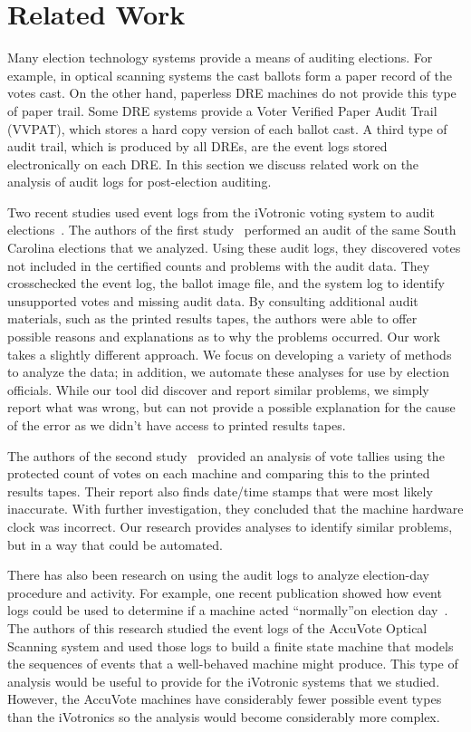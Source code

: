 \section{Related Work}
Many election technology systems provide a means of auditing elections. For example, in optical scanning systems the cast ballots form a paper record of the votes cast.  On the other hand, paperless DRE machines do not provide this type of paper trail. Some DRE systems provide a Voter Verified Paper Audit Trail (VVPAT), which stores a hard copy version of each ballot cast.  A third type of audit trail, which is produced by all DREs, are the event logs stored electronically on each DRE.  In this section we discuss related work on the analysis of audit logs for post-election auditing. 

Two recent studies used event logs from the iVotronic voting system to audit elections~\cite{Buell2011,Sandler2007}. The authors of the first study~\cite{Buell2011} performed an audit of the same South Carolina elections that we analyzed. Using these audit logs, they discovered votes not included in the certified counts and problems with the audit data. They crosschecked the event log, the ballot image file, and the system log to identify unsupported votes and missing audit data.  By consulting additional audit materials, such as the printed results tapes, the authors were able to offer possible reasons and explanations as to why the problems occurred. Our work takes a slightly different approach.  We focus on developing a variety of methods to analyze the data; in addition, we automate these analyses for use by election officials.  While our tool did discover and report similar problems, we simply report what was wrong, but can not provide a possible explanation for the cause of the error as we didn't have access to printed results tapes. 

The authors of the second study~\cite{Sandler2007} provided an analysis of vote tallies using the protected count of votes on each machine and comparing this to the printed results tapes. Their report also finds date/time stamps that were most likely inaccurate.  With further investigation, they concluded that the machine hardware clock was incorrect. Our research provides analyses to identify similar problems, but in a way that could be automated. 

There has also been research on using the audit logs to analyze election-day procedure and activity. For example, one recent publication showed how event logs could be used to determine if a machine acted \textquotedblleft normally\textquotedblright on election day~\cite{Antonyan2009}. The authors of this research studied the event logs of the AccuVote Optical Scanning system and used those logs to build a finite state machine that models the sequences of events that a well-behaved machine might produce. This type of analysis would be useful to provide for the iVotronic systems that we studied. However, the AccuVote machines have considerably fewer possible event types than the iVotronics so the analysis would become considerably more complex. 

